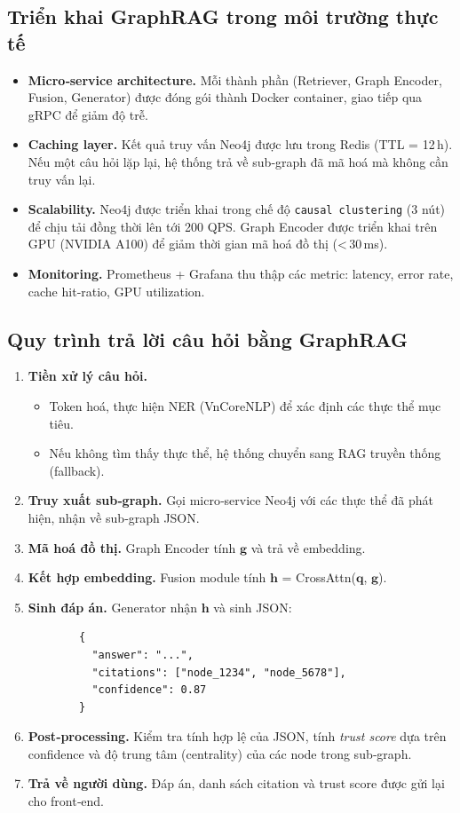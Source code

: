 \subsection{Triển khai GraphRAG trong môi trường thực tế}
\label{subsec:implementation}
\begin{itemize}
  \item \textbf{Micro‑service architecture.} Mỗi thành phần (Retriever, Graph Encoder, Fusion, Generator) được đóng gói thành Docker container, giao tiếp qua gRPC để giảm độ trễ.
  \item \textbf{Caching layer.} Kết quả truy vấn Neo4j được lưu trong Redis (TTL = 12 h). Nếu một câu hỏi lặp lại, hệ thống trả về sub‑graph đã mã hoá mà không cần truy vấn lại.
  \item \textbf{Scalability.} Neo4j được triển khai trong chế độ \texttt{causal clustering} (3 nút) để chịu tải đồng thời lên tới 200 QPS. Graph Encoder được triển khai trên GPU (NVIDIA A100) để giảm thời gian mã hoá đồ thị (< 30 ms).
  \item \textbf{Monitoring.} Prometheus + Grafana thu thập các metric: latency, error rate, cache hit‑ratio, GPU utilization.
\end{itemize}
\subsection{Quy trình trả lời câu hỏi bằng GraphRAG}
\label{subsec:answer_flow}
\begin{enumerate}
  \item \textbf{Tiền xử lý câu hỏi.}  
        \begin{itemize}
          \item Token hoá, thực hiện NER (VnCoreNLP) để xác định các thực thể mục tiêu.
          \item Nếu không tìm thấy thực thể, hệ thống chuyển sang RAG truyền thống (fallback).
        \end{itemize}
  \item \textbf{Truy xuất sub‑graph.} Gọi micro‑service Neo4j với các thực thể đã phát hiện, nhận về sub‑graph JSON.
  \item \textbf{Mã hoá đồ thị.} Graph Encoder tính $\mathbf{g}$ và trả về embedding.
  \item \textbf{Kết hợp embedding.} Fusion module tính $\mathbf{h}$ = CrossAttn($\mathbf{q}$, $\mathbf{g}$).
  \item \textbf{Sinh đáp án.} Generator nhận $\mathbf{h}$ và sinh JSON:  
        \begin{verbatim}
        {
          "answer": "...",
          "citations": ["node_1234", "node_5678"],
          "confidence": 0.87
        }
        \end{verbatim}
  \item \textbf{Post‑processing.} Kiểm tra tính hợp lệ của JSON, tính \textit{trust score} dựa trên confidence và độ trung tâm (centrality) của các node trong sub‑graph.
  \item \textbf{Trả về người dùng.} Đáp án, danh sách citation và trust score được gửi lại cho front‑end.
\end{enumerate}
